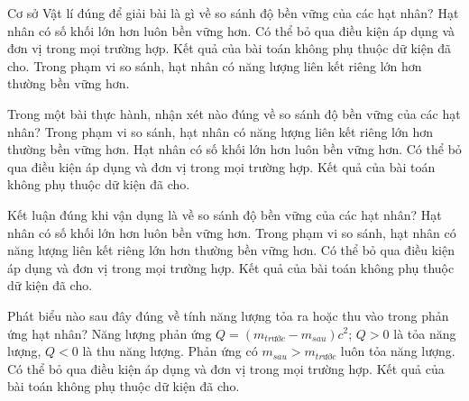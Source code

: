 \begin{ex}
Cơ sở Vật lí đúng để giải bài là gì về so sánh độ bền vững của các hạt nhân?
\choice
{Hạt nhân có số khối lớn hơn luôn bền vững hơn.}
{Có thể bỏ qua điều kiện áp dụng và đơn vị trong mọi trường hợp.}
{Kết quả của bài toán không phụ thuộc dữ kiện đã cho.}
{\True Trong phạm vi so sánh, hạt nhân có năng lượng liên kết riêng lớn hơn thường bền vững hơn.}
\end{ex}

\begin{ex}
Trong một bài thực hành, nhận xét nào đúng về so sánh độ bền vững của các hạt nhân?
\choice
{\True Trong phạm vi so sánh, hạt nhân có năng lượng liên kết riêng lớn hơn thường bền vững hơn.}
{Hạt nhân có số khối lớn hơn luôn bền vững hơn.}
{Có thể bỏ qua điều kiện áp dụng và đơn vị trong mọi trường hợp.}
{Kết quả của bài toán không phụ thuộc dữ kiện đã cho.}
\end{ex}

\begin{ex}
Kết luận đúng khi vận dụng là về so sánh độ bền vững của các hạt nhân?
\choice
{Hạt nhân có số khối lớn hơn luôn bền vững hơn.}
{\True Trong phạm vi so sánh, hạt nhân có năng lượng liên kết riêng lớn hơn thường bền vững hơn.}
{Có thể bỏ qua điều kiện áp dụng và đơn vị trong mọi trường hợp.}
{Kết quả của bài toán không phụ thuộc dữ kiện đã cho.}
\end{ex}

\begin{ex}
Phát biểu nào sau đây đúng về tính năng lượng tỏa ra hoặc thu vào trong phản ứng hạt nhân?
\choice
{\True Năng lượng phản ứng $Q=(m_{trước}-m_{sau})c^2$; $Q>0$ là tỏa năng lượng, $Q<0$ là thu năng lượng.}
{Phản ứng có $m_{sau}\gt m_{trước}$ luôn tỏa năng lượng.}
{Có thể bỏ qua điều kiện áp dụng và đơn vị trong mọi trường hợp.}
{Kết quả của bài toán không phụ thuộc dữ kiện đã cho.}
\end{ex}

